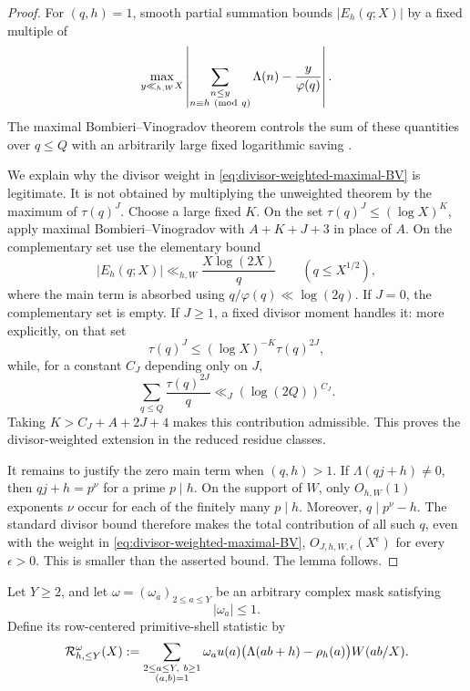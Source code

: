 \begin{proof}
For $(q,h)=1$, smooth partial summation bounds $|E_h(q;X)|$ by a fixed
multiple of
\[
 \max_{y\ll_{h,W}X}
 \left|
  \sum_{\substack{n\leq y\\n\equiv h\ ({\rm mod}\ q)}}\Lambda(n)
  -\frac{y}{\varphi(q)}
 \right|.
\]
The maximal Bombieri--Vinogradov theorem controls the sum of these
quantities over $q\leq Q$ with an arbitrarily large fixed logarithmic
saving \citep{IwaniecKowalski2004,MontgomeryVaughan2007}.

We explain why the divisor weight in
\eqref{eq:divisor-weighted-maximal-BV} is legitimate.  It is not obtained
by multiplying the unweighted theorem by the maximum of $\tau(q)^J$.
Choose a large fixed $K$.  On the set
$\tau(q)^J\leq(\log X)^K$, apply maximal Bombieri--Vinogradov with
$A+K+J+3$ in place of $A$.  On the complementary set use the elementary
bound
\begin{equation}
 |E_h(q;X)|\ll_{h,W}\frac{X\log(2X)}q
 \qquad(q\leq X^{1/2}),
 \label{eq:row-discrepancy-trivial-bound}
\end{equation}
where the main term is absorbed using
$q/\varphi(q)\ll\log(2q)$.  If $J=0$, the complementary set is empty.
If $J\geq1$, a fixed divisor moment handles it: more explicitly, on that
set
\[
 \tau(q)^J
 \leq(\log X)^{-K}\tau(q)^{2J},
\]
while, for a constant $C_J$ depending only on $J$,
\[
 \sum_{q\leq Q}\frac{\tau(q)^{2J}}q
 \ll_J(\log(2Q))^{C_J}.
\]
Taking $K>C_J+A+2J+4$ makes this contribution admissible.  This proves
the divisor-weighted extension in the reduced residue classes.

It remains to justify the zero main term when $(q,h)>1$.  If
$\Lambda(qj+h)\ne0$, then $qj+h=p^\nu$ for a prime $p\mid h$.  On the
support of $W$, only $O_{h,W}(1)$ exponents $\nu$ occur for each of the
finitely many $p\mid h$.  Moreover, $q\mid p^\nu-h$.  The standard
divisor bound therefore makes the total contribution of all such $q$,
even with the weight in \eqref{eq:divisor-weighted-maximal-BV},
$O_{J,h,W,\epsilon}(X^\epsilon)$ for every $\epsilon>0$.  This is smaller
than the asserted bound.  The lemma follows.
\end{proof}

Let $Y\geq2$, and let $\omega=(\omega_a)_{2\leq a\leq Y}$ be an arbitrary
complex mask satisfying
\begin{equation}
 |\omega_a|\leq1.
 \label{eq:quarter-mask-bound}
\end{equation}
Define its row-centered primitive-shell statistic by
\begin{equation}
 \mathcal R_{h,\leq Y}^{\omega}(X):=
 \sum_{\substack{2\leq a\leq Y,\ b\geq1\\(a,b)=1}}
 \omega_a u(a)
 \bigl(\Lambda(ab+h)-\rho_h(a)\bigr)W(ab/X).
 \label{eq:masked-quarter-residual}
\end{equation}

